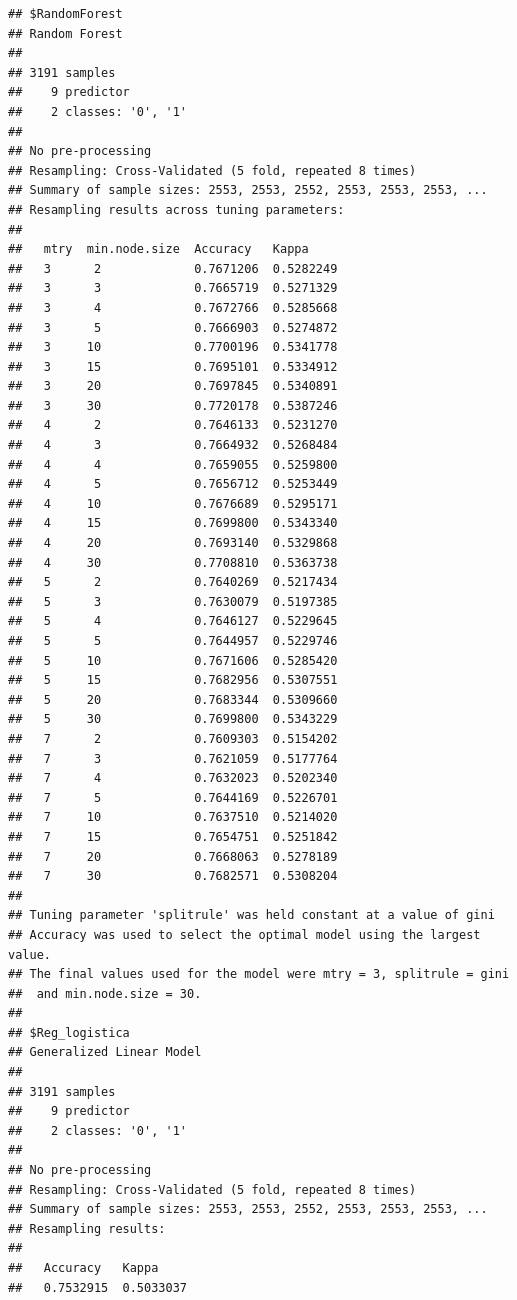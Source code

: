 \documentclass[]{article}
\begin{document}
\begin{lstlisting}
## $RandomForest
## Random Forest 
## 
## 3191 samples
##    9 predictor
##    2 classes: '0', '1' 
## 
## No pre-processing
## Resampling: Cross-Validated (5 fold, repeated 8 times) 
## Summary of sample sizes: 2553, 2553, 2552, 2553, 2553, 2553, ... 
## Resampling results across tuning parameters:
## 
##   mtry  min.node.size  Accuracy   Kappa    
##   3      2             0.7671206  0.5282249
##   3      3             0.7665719  0.5271329
##   3      4             0.7672766  0.5285668
##   3      5             0.7666903  0.5274872
##   3     10             0.7700196  0.5341778
##   3     15             0.7695101  0.5334912
##   3     20             0.7697845  0.5340891
##   3     30             0.7720178  0.5387246
##   4      2             0.7646133  0.5231270
##   4      3             0.7664932  0.5268484
##   4      4             0.7659055  0.5259800
##   4      5             0.7656712  0.5253449
##   4     10             0.7676689  0.5295171
##   4     15             0.7699800  0.5343340
##   4     20             0.7693140  0.5329868
##   4     30             0.7708810  0.5363738
##   5      2             0.7640269  0.5217434
##   5      3             0.7630079  0.5197385
##   5      4             0.7646127  0.5229645
##   5      5             0.7644957  0.5229746
##   5     10             0.7671606  0.5285420
##   5     15             0.7682956  0.5307551
##   5     20             0.7683344  0.5309660
##   5     30             0.7699800  0.5343229
##   7      2             0.7609303  0.5154202
##   7      3             0.7621059  0.5177764
##   7      4             0.7632023  0.5202340
##   7      5             0.7644169  0.5226701
##   7     10             0.7637510  0.5214020
##   7     15             0.7654751  0.5251842
##   7     20             0.7668063  0.5278189
##   7     30             0.7682571  0.5308204
## 
## Tuning parameter 'splitrule' was held constant at a value of gini
## Accuracy was used to select the optimal model using the largest value.
## The final values used for the model were mtry = 3, splitrule = gini
##  and min.node.size = 30.
## 
## $Reg_logistica
## Generalized Linear Model 
## 
## 3191 samples
##    9 predictor
##    2 classes: '0', '1' 
## 
## No pre-processing
## Resampling: Cross-Validated (5 fold, repeated 8 times) 
## Summary of sample sizes: 2553, 2553, 2552, 2553, 2553, 2553, ... 
## Resampling results:
## 
##   Accuracy   Kappa    
##   0.7532915  0.5033037
\end{lstlisting}
\end{document}
